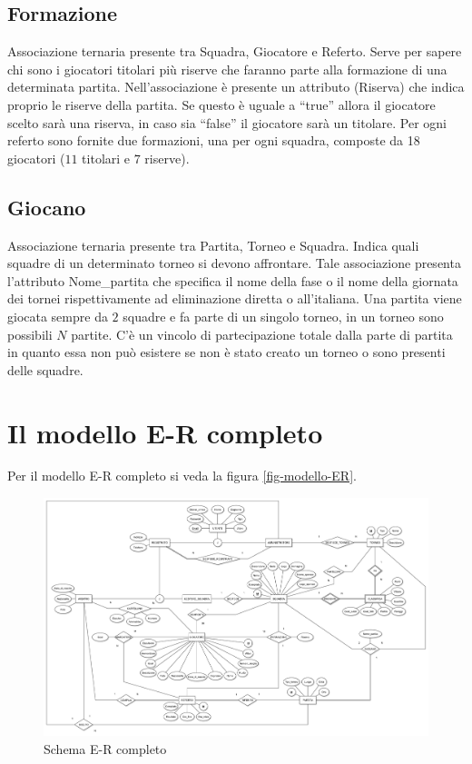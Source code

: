 	\subsection{Formazione}
	Associazione ternaria presente tra Squadra, Giocatore e Referto.
	Serve per sapere chi sono i giocatori titolari più riserve che faranno parte alla formazione di una determinata partita.
	Nell’associazione è presente un attributo (Riserva) che indica proprio le riserve della partita.
	Se questo è uguale a ``true'' allora il giocatore scelto sarà una riserva, in caso sia ``false'' il giocatore sarà un titolare.
	Per ogni referto sono fornite due formazioni, una per ogni squadra, composte da 18 giocatori ($11$ titolari e $7$ riserve).
	
	\subsection{Giocano}
	Associazione ternaria presente tra Partita, Torneo e Squadra.
	Indica quali squadre di un determinato torneo si devono affrontare. Tale associazione presenta l’attributo Nome\_partita che specifica il nome della fase o il nome della giornata dei tornei rispettivamente ad eliminazione diretta o all’italiana. Una partita viene giocata sempre da $2$ squadre e fa parte di un singolo torneo, in un torneo sono possibili $N$ partite. C’è un vincolo di partecipazione totale dalla parte di partita in quanto essa non può esistere se non è stato creato un torneo o sono presenti delle squadre.
	

\section{Il modello E-R completo}
Per il modello E-R completo si veda la figura \vref{fig-modello-ER}.


\begin{figure}[h]
	\centering
	\includegraphics[height=1\textwidth,
	angle=90]
	{immagini/diagramma-ER-completo}
	
	\caption{Schema E-R completo}
	
	\label{fig-modello-ER}
\end{figure}	